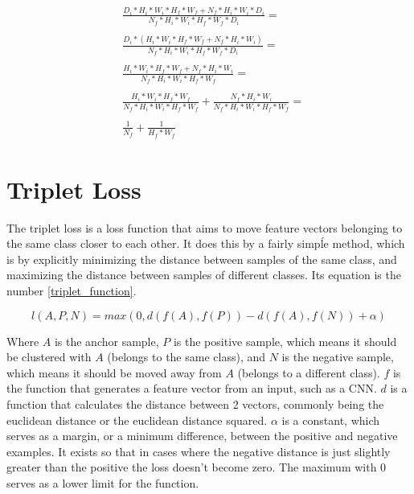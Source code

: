 \documentclass[runningheads]{llncs}
\begin{document}
\begin{align}
    \label{cost_ratio}
    \begin{aligned}
        & \frac{ D_{i} * H_{i} * W_{i} * H_{f} * W_{f} + N_{f} * H_{i} * W_{i} * D_{i} }{ N_{f} * H_{i} * W_{i} * H_{f} * W_{f} * D_{i} } = \\ \\
        & \frac{ D_{i} * (H_{i} * W_{i} * H_{f} * W_{f} + N_{f} * H_{i} * W_{i}) }{ N_{f} * H_{i} * W_{i} * H_{f} * W_{f} * D_{i} } = \\ \\
        & \frac{ H_{i} * W_{i} * H_{f} * W_{f} + N_{f} * H_{i} * W_{i} }{ N_{f} * H_{i} * W_{i} * H_{f} * W_{f} } = \\ \\
        & \frac{ H_{i} * W_{i} * H_{f} * W_{f} }{ N_{f} * H_{i} * W_{i} * H_{f} * W_{f} } + \frac{ N_{f} * H_{i} * W_{i} }{ N_{f} * H_{i} * W_{i} * H_{f} * W_{f} } = \\ \\
        & \frac{ 1 }{ N_{f} } + \frac{ 1 }{ H_{f} * W_{f} }
    \end{aligned}
\end{align}



\section{Triplet Loss}

The triplet loss\cite{schroff2015facenet} is a loss function that aims to move feature vectors belonging to the same class closer to each other. It does this by a fairly simpĺe method, which is by explicitly minimizing the distance between samples of the same class, and maximizing the distance between samples of different classes. Its equation is the number \ref{triplet_function}.

\begin{equation}
    \label{triplet_function}
    l(A, P, N) = max(0, d(f(A), f(P)) - d(f(A), f(N)) + \alpha)
\end{equation}

Where $A$ is the anchor sample, $P$ is the positive sample, which means it should be clustered with $A$ (belongs to the same class), and $N$ is the negative sample, which means it should be moved away from $A$ (belongs to a different class). $f$ is the function that generates a feature vector from an input, such as a CNN. $d$ is a function that calculates the distance between 2 vectors, commonly being the euclidean distance or the euclidean distance squared. $\alpha$ is a constant, which serves as a margin, or a minimum difference, between the positive and negative examples. It exists so that in cases where the negative distance is just slightly greater than the positive the loss doesn't become zero. The maximum with 0 serves as a lower limit for the function.
\end{document}
